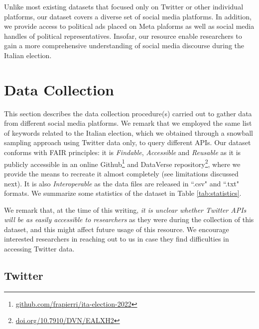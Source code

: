 \documentclass[sigconf,screen]{acmart}
\begin{document}
Unlike most existing datasets that focused only on Twitter or other individual platforms, our dataset covers a diverse set of social media platforms. In addition, we provide access to political ads placed on Meta plaforms as well as social media handles of political representatives. Insofar, our resource enable researchers to gain a more comprehensive understanding of social media discourse during the Italian election.

\section{Data Collection}

This section describes the data collection procedure(s) carried out to gather data from different social media platforms. We remark that we employed the same list of keywords related to the Italian election, which we obtained through a snowball sampling approach using Twitter data only, to query different APIs. Our dataset conforms with FAIR principles: it is \textit{Findable}, \textit{Accessible} and \textit{Reusable} as it is publicly accessible in an online Github\footnote{\url{github.com/frapierri/ita-election-2022}} and DataVerse repository\footnote{\url{doi.org/10.7910/DVN/EALXH2}}, where we provide the means to recreate it almost completely (see limitations discussed next). It is also \textit{Interoperable} as the data files are released in ``.csv" and ``.txt" formats.  We summarize some statistics of the dataset in Table \ref{tab:statistics}. 

We remark that, at the time of this writing, \textit{it is unclear whether Twitter APIs will be as easily accessible to researchers} as they were during the collection of this dataset, and this might affect future usage of this resource. We encourage interested researchers in reaching out to us in case they find difficulties in accessing Twitter data.


\subsection{Twitter}
\end{document}
